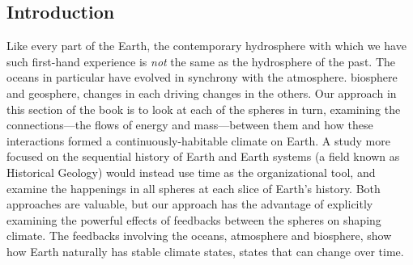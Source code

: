 {\subsection{Introduction}
Like every part of the Earth, the contemporary hydrosphere with which we have such first-hand experience is \emph{not} the same as the hydrosphere of the past. The oceans in particular have evolved in synchrony with the atmosphere. biosphere and geosphere, changes in each driving changes in the others. Our approach in this section of the book is to look at each of the spheres in turn, examining the connections---the flows of energy and mass---between them and how these interactions formed a continuously-habitable climate on Earth. A study more focused on the sequential history of Earth and Earth systems (a field known as Historical Geology) would instead use time as the organizational tool, and examine the happenings in all spheres at each slice of Earth's history. Both approaches are valuable, but our approach has the advantage of explicitly examining the powerful effects of feedbacks between the spheres on shaping climate. The feedbacks involving the oceans, atmosphere and biosphere, show how Earth naturally has stable climate states, states that can change over time.
}
